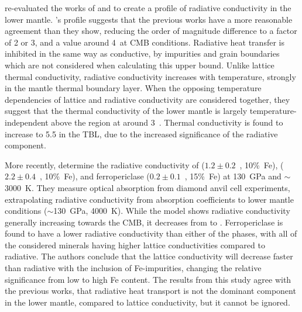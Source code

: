 \citet{Tang2014} re-evaluated the works of \citet{Keppler2008} and \citet{Goncharov2008} to create a profile of radiative conductivity in the lower mantle. \citeauthor{Tang2014}'s profile suggests that the previous works have a more reasonable agreement than they show, reducing the order of magnitude difference to a factor of 2 or 3, and a value around 4~\wmk at CMB conditions. Radiative heat transfer is inhibited in the same way as conductive, by impurities and grain boundaries which are not considered when calculating this upper bound. Unlike lattice thermal conductivity, radiative conductivity increases with temperature, strongly in the mantle thermal boundary layer. When the opposing temperature dependencies of lattice and radiative conductivity are considered together, they suggest that the thermal conductivity of the lower mantle is largely temperature-independent above the \ddds region at around 3~\wmk. Thermal conductivity is found to increase to 5.5 \wmks in the TBL, due to the increased significance of the radiative component.

More recently, \citet{Lobanov2017} determine the radiative conductivity of \ppvs ($1.2\pm0.2$~\wmk, 10\%~Fe), \bdgs ($2.2\pm0.4$~\wmk, 10\%~Fe), and ferropericlase ($0.2\pm0.1$~\wmk, 15\%~Fe) at 130~GPa and $\sim$3000~K. They measure optical absorption from diamond anvil cell experiments, extrapolating radiative conductivity from absorption coefficients to lower mantle conditions ($\sim$130~GPa, 4000~K). While the model shows radiative conductivity generally increasing towards the CMB, it decreases from \bdgs to \ppv. Ferropericlase is found to have a lower radiative conductivity than either of the \mgfesios phases, with all of the considered minerals having higher lattice conductivities compared to radiative. The authors conclude that the lattice conductivity will decrease faster than radiative with the inclusion of Fe-impurities, changing the relative significance from low to high Fe content. The results from this study agree with the previous works, that radiative heat transport is not the dominant component in the lower mantle, compared to lattice conductivity, but it cannot be ignored.

